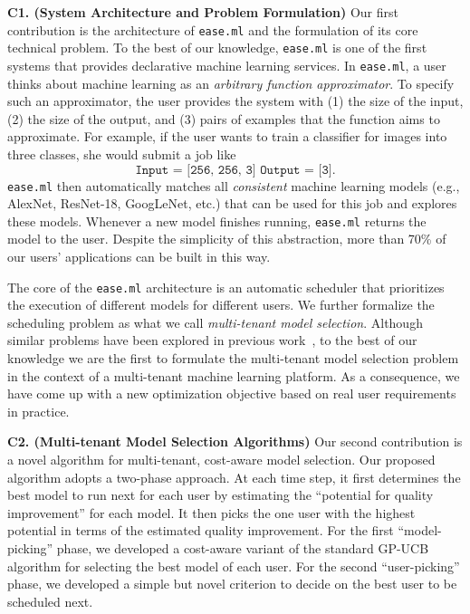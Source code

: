 \documentclass[letterpaper]{vldb}
\newcommand{\eml}{\texttt{ease.ml}\xspace}
\begin{document}
\noindent
{\bf C1. (System Architecture and Problem Formulation)}
Our first contribution is the architecture of \eml and the formulation of its core technical problem.
To the best of our knowledge, \eml is one of the first systems that provides declarative machine learning services.
In \eml, a user thinks about machine learning as an {\em arbitrary function approximator}.
To specify such an approximator, the user provides the
system with (1) the size of the input, (2) the size of the output,
and (3) pairs of examples that the function aims to approximate.
For example, if the user wants to train a classifier
for images into three classes, she would submit a job like
\vspace{-0.5em}
\[
\texttt{Input = [256, 256, 3]
        Output = [3]}.
\]
\eml then automatically matches all {\em consistent} machine learning models (e.g., AlexNet, ResNet-18, GoogLeNet, etc.) 
that can be used for this job and explores these models.
Whenever a new model finishes running, \eml returns the model to the user.
Despite the simplicity of this abstraction, more than 70\% of
our users' applications can be built in this way.



The core of the \eml architecture is an automatic scheduler that prioritizes the execution of different models for different users.
We further formalize the scheduling problem as what we call {\em multi-tenant model selection}.
Although similar problems have been explored in previous work~\cite{Swersky2013}, to the best of our knowledge we are the first to formulate the multi-tenant model selection problem in the context of a multi-tenant machine learning platform.
As a consequence, we have come up with a new optimization objective based on real user requirements in practice.


\noindent
{\bf C2. (Multi-tenant Model Selection Algorithms)} Our second contribution
is a novel algorithm for 
multi-tenant, cost-aware model selection.
Our proposed algorithm adopts a two-phase approach.
At each time step, it first determines the 
best model to run next for each user by
estimating the ``potential for quality improvement'' for each model.
It then picks the one user with the highest potential in terms of the estimated quality improvement.
For the first ``model-picking'' phase, we developed a cost-aware variant of the 
standard GP-UCB algorithm for selecting the best model of 
each user. For the second ``user-picking'' phase, we developed a simple but novel criterion to decide on the best user to be scheduled next.
\end{document}
